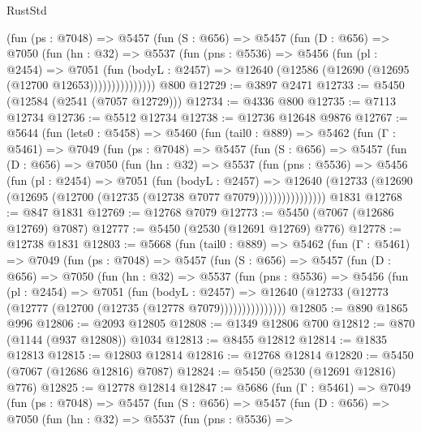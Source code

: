 \begin{lexlean}{RustStd}
\begin{coremodule}
            (fun (ps : @7048) =>
            @5457
              (fun (S : @656) =>
              @5457
                (fun (D : @656) =>
                @7050
                  (fun (hn : @32) =>
                  @5537
                    (fun (pns : @5536) =>
                    @5456
                      (fun (pl : @2454) =>
                      @7051
                        (fun (bodyL : @2457) =>
                        @12640 (@12586 (@12690 (@12695 (@12700 @12653)))))))))))))))
    @800
@12729 := @3897 @2471
@12733 := @5450 (@12584 (@2541 (@7057 @12729)))
@12734 := @4336 @800
@12735 := @7113 @12734
@12736 := @5512 @12734
@12738 := @12736 @12648 @9876
@12767 := @5644
    (fun (lets0 : @5458) =>
    @5460
      (fun (tail0 : @889) =>
      @5462
        (fun (Γ : @5461) =>
        @7049
          (fun (ps : @7048) =>
          @5457
            (fun (S : @656) =>
            @5457
              (fun (D : @656) =>
              @7050
                (fun (hn : @32) =>
                @5537
                  (fun (pns : @5536) =>
                  @5456
                    (fun (pl : @2454) =>
                    @7051
                      (fun (bodyL : @2457) =>
                      @12640
                        (@12733 (@12690 (@12695 (@12700 (@12735 (@12738 @7077 @7079))))))))))))))))
    @1831
@12768 := @847 @1831
@12769 := @12768 @7079
@12773 := @5450 (@7067 (@12686 @12769) @7087)
@12777 := @5450 (@2530 (@12691 @12769) @776)
@12778 := @12738 @1831
@12803 := @5668
    (fun (tail0 : @889) =>
    @5462
      (fun (Γ : @5461) =>
      @7049
        (fun (ps : @7048) =>
        @5457
          (fun (S : @656) =>
          @5457
            (fun (D : @656) =>
            @7050
              (fun (hn : @32) =>
              @5537
                (fun (pns : @5536) =>
                @5456
                  (fun (pl : @2454) =>
                  @7051
                    (fun (bodyL : @2457) =>
                    @12640 (@12733 (@12773 (@12777 (@12700 (@12735 (@12778 @7079)))))))))))))))
@12805 := @890 @1865 @996
@12806 := @2093 @12805
@12808 := @1349 @12806 @700
@12812 := @870 (@1144 (@937 @12808)) @1034
@12813 := @8455 @12812
@12814 := @1835 @12813
@12815 := @12803 @12814
@12816 := @12768 @12814
@12820 := @5450 (@7067 (@12686 @12816) @7087)
@12824 := @5450 (@2530 (@12691 @12816) @776)
@12825 := @12778 @12814
@12847 := @5686
    (fun (Γ : @5461) =>
    @7049
      (fun (ps : @7048) =>
      @5457
        (fun (S : @656) =>
        @5457
          (fun (D : @656) =>
          @7050
            (fun (hn : @32) =>
            @5537
              (fun (pns : @5536) =>

\end{coremodule}
\end{lexlean}
